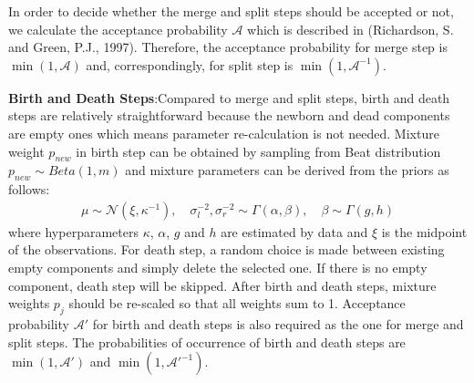 \documentclass[conference]{IEEEtran}
\begin{document}
In order to decide whether the merge and split steps should be accepted or not, we calculate the acceptance probability $\mathcal{A}$ which is described in (Richardson, S. and Green, P.J., 1997)\cite{b1}. Therefore, the acceptance probability for merge step is $\min(1,\mathcal{A})$ and, correspondingly, for split step is $\min(1,\mathcal{A}^{-1})$.

\textbf{Birth and Death Steps}:Compared to merge and split steps, birth and death steps are relatively straightforward because the newborn and dead components are empty ones which means parameter re-calculation is not needed. Mixture weight $p_{new}$ in birth step can be obtained by sampling from Beat distribution $p_{new} \sim Beta(1,m)$ and mixture parameters can be derived from the priors as follows\cite{casella}:
\begin{align}
\mu \sim \mathcal{N}(\xi,\kappa^{-1}), \quad \sigma_{l}^{-2},\sigma_{r}^{-2} \sim \Gamma(\alpha,\beta), \quad \beta \sim \Gamma(g,h)
\label{eq:prior}
\end{align}
where hyperparameters $\kappa$, $\alpha$, $g$ and $h$ are estimated by data and $\xi$ is the midpoint of the observations. For death step, a random choice is made between existing empty components and simply delete the selected one. If there is no empty component, death step will be skipped. After birth and death steps, mixture weights $p_j$ should be re-scaled so that all weights sum to 1. Acceptance probability $\mathcal{A}'$ for birth and death steps is also required as the one for merge and split steps. The probabilities of occurrence of birth and death steps are $\min(1,\mathcal{A}')$ and $\min(1,\mathcal{A}'^{-1})$\cite{b1}.
\end{document}
